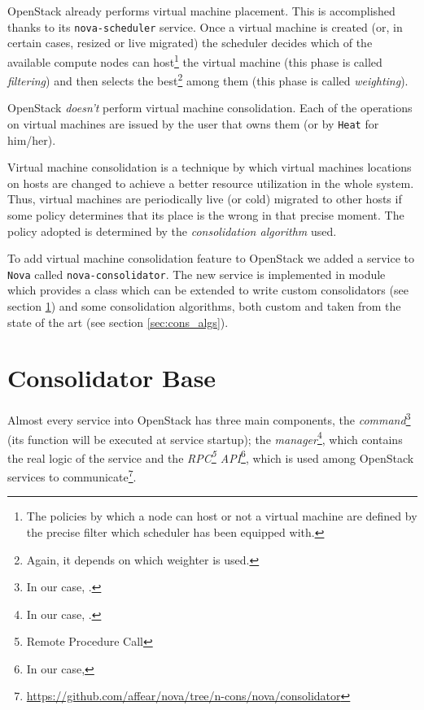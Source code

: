 OpenStack already performs virtual machine placement. This is accomplished thanks to its \texttt{nova-scheduler} service. Once a virtual machine is created (or, in certain cases, resized or live migrated) the scheduler decides which of the available compute nodes can host\footnote{The policies by which a node can host or not a virtual machine are defined by the precise filter which scheduler has been equipped with.} the virtual machine (this phase is called \textit{filtering}) and then selects the best\footnote{Again, it depends on which weighter is used.} among them (this phase is called \textit{weighting}).

OpenStack \emph{doesn't} perform virtual machine consolidation. Each of the operations on virtual machines are issued by the user that owns them (or by \texttt{Heat} for him/her).

Virtual machine consolidation is a technique by which virtual machines locations on hosts are changed to achieve a better resource utilization in the whole system. Thus, virtual machines are periodically live (or cold) migrated to other hosts if some policy determines that its place is the wrong in that precise moment. The policy adopted is determined by the \emph{consolidation algorithm} used.

To add virtual machine consolidation feature to OpenStack we added a service to \texttt{Nova} called \texttt{nova-consolidator}. The new service is implemented in module  which provides a  class which can be extended to write custom consolidators (see section \ref{sec:cons_base}) and some consolidation algorithms, both custom and taken from the state of the art (see section \ref{sec:cons_algs}).

\section{Consolidator Base}
\label{sec:cons_base}

Almost every service into OpenStack has three main components, the \emph{command}\footnote{In our case, .} (its function  will be executed at service startup); the \emph{manager}\footnote{In our case, .}, which contains the real logic of the service and the \emph{RPC\footnote{Remote Procedure Call} API}\footnote{In our case, }, which is used among OpenStack services to communicate\footnote{\url{https://github.com/affear/nova/tree/n-cons/nova/consolidator}}.

